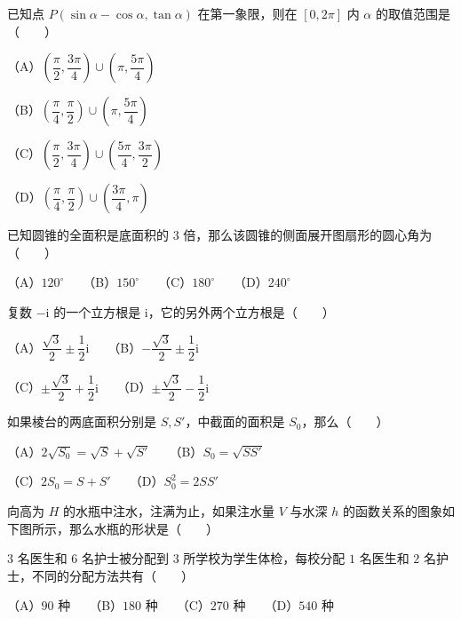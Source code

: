 \begin{question}
已知点 $P(\sin\alpha-\cos\alpha,\tan\alpha)$ 在第一象限，则在 $[0,2\pi]$ 内 $\alpha$ 的取值范围是\mbox{（　　）}

（A）$\left(\dfrac\pi2,\dfrac{3\pi}4\right)\cup\left(\pi,\dfrac{5\pi}4\right)$

（B）$\left(\dfrac\pi4,\dfrac\pi2\right)\cup\left(\pi,\dfrac{5\pi}4\right)$

（C）$\left(\dfrac\pi2,\dfrac{3\pi}4\right)\cup\left(\dfrac{5\pi}4,\dfrac{3\pi}2\right)$

（D）$\left(\dfrac\pi4,\dfrac\pi2\right)\cup\left(\dfrac{3\pi}4,\pi\right)$

\end{question}
\begin{question}
已知圆锥的全面积是底面积的 3 倍，那么该圆锥的侧面展开图扇形的圆心角为\mbox{（　　）}

（A）$120^\circ$　　（B）$150^\circ$　　（C）$180^\circ$　　（D）$240^\circ$

\end{question}
\begin{question}
复数 $-\mathrm{i}$ 的一个立方根是 $\mathrm{i}$，它的另外两个立方根是\mbox{（　　）}

（A）$\dfrac{\sqrt3}{2}\pm\dfrac12\mathrm{i}$　　（B）$-\dfrac{\sqrt3}{2}\pm\dfrac12\mathrm{i}$

（C）$\pm\dfrac{\sqrt3}{2}+\dfrac12\mathrm{i}$　　（D）$\pm\dfrac{\sqrt3}{2}-\dfrac12\mathrm{i}$

\end{question}
\begin{question}
如果棱台的两底面积分别是 $S,S'$，中截面的面积是 $S_0$，那么\mbox{（　　）}

（A）$2\sqrt{S_0}=\sqrt S+\sqrt{S'}$　　（B）$S_0=\sqrt{SS'}$

（C）$2S_0=S+S'$　　（D）$S_0^2=2SS'$

\Needspace{0.4\textheight}
\end{question}
\begin{question}
向高为 $H$ 的水瓶中注水，注满为止，如果注水量 $V$ 与水深 $h$ 的函数关系的图象如下图所示，那么水瓶的形状是\mbox{（　　）}
\nopagebreak[4]
\begin{center}\end{center}
\nopagebreak[4]
\end{question}
\begin{question}
$3$ 名医生和 $6$ 名护士被分配到 $3$ 所学校为学生体检，每校分配 $1$ 名医生和 $2$ 名护士，不同的分配方法共有\mbox{（　　）}

（A）$90$ 种　　（B）$180$ 种　　（C）$270$ 种　　（D）$540$ 种

\end{question}
